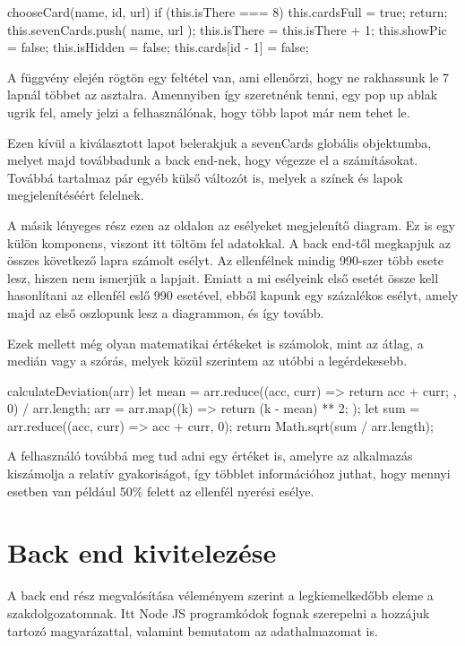 \begin{python}
    chooseCard(name, id, url) {
      if (this.isThere === 8) {
        this.cardsFull = true;
        return;
      }
      this.sevenCards.push({ name, url });
      this.isThere = this.isThere + 1;
      this.showPic = false;
      this.isHidden = false;
      this.cards[id - 1] = false;
    }
\end{python}

A függvény elején rögtön egy feltétel van, ami ellenőrzi, hogy ne rakhassunk le 7 lapnál többet az asztalra. Amennyiben így szeretnénk tenni, egy pop up ablak ugrik fel, amely jelzi a felhasználónak, hogy több lapot már nem tehet le.

Ezen kívül a kiválasztott lapot belerakjuk a sevenCards globális objektumba, melyet majd továbbadunk a back end-nek, hogy végezze el a számításokat. Továbbá tartalmaz pár egyéb külső változót is, melyek a színek és lapok megjelenítéséért felelnek.

A másik lényeges rész ezen az oldalon az esélyeket megjelenítő diagram. Ez is egy külön komponens, viszont itt töltöm fel adatokkal. A back end-től megkapjuk az összes következő lapra számolt esélyt. Az ellenfélnek mindig 990-szer több esete lesz, hiszen nem ismerjük a lapjait. Emiatt a mi esélyeink első esetét össze kell hasonlítani az ellenfél eslő 990 esetével, ebből kapunk egy százalékos esélyt, amely majd az első oszlopunk lesz a diagrammon, és így tovább. 

Ezek mellett még olyan matematikai értékeket is számolok, mint az átlag, a medián vagy a szórás, melyek közül szerintem az utóbbi a legérdekesebb.

\begin{python}
        calculateDeviation(arr) {
      let mean =
        arr.reduce((acc, curr) => {
          return acc + curr;
        }, 0) / arr.length;
      arr = arr.map((k) => {
        return (k - mean) ** 2;
      });
      let sum = arr.reduce((acc, curr) => acc + curr, 0);
      return Math.sqrt(sum / arr.length);
    }
\end{python}

A felhasználó továbbá meg tud adni egy értéket is, amelyre az alkalmazás kiszámolja a relatív gyakoriságot, így többlet információhoz juthat, hogy mennyi esetben van például 50\% felett az ellenfél nyerési esélye.

\section{Back end kivitelezése}
A back end rész megvalósítása véleményem szerint a legkiemelkedőbb eleme a szakdolgozatomnak. Itt Node JS programkódok fognak szerepelni a hozzájuk tartozó magyarázattal, valamint bemutatom az adathalmazomat is.

